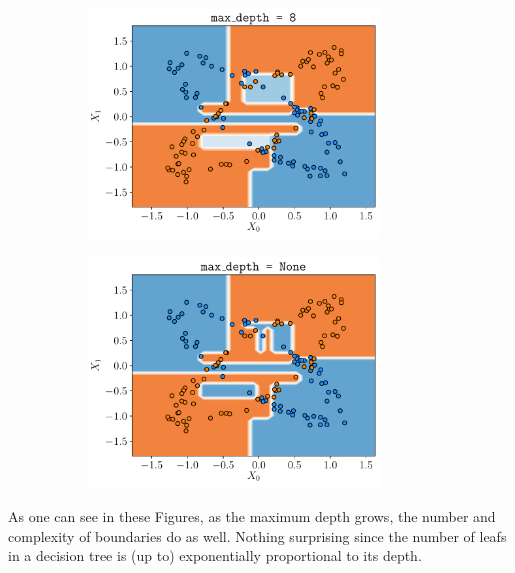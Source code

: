 \documentclass[a4paper, 12pt]{article}
\begin{document}
\begin{enumerate}[label = (\alph*)]
\begin{figure}[h]
\begin{subfigure}{0.49\textwidth}
        	    \includegraphics[width=0.85\textwidth]{resources/pdf/make_data2_depth8.pdf}
            \end{subfigure}
            \begin{subfigure}{0.49\textwidth}
                \centering
        	    \includegraphics[width=0.85\textwidth]{resources/pdf/make_data2_depthNone.pdf}
            \end{subfigure}
            \label{fig:decision_boundary_decision_tree_make_data2}
        \end{figure}
        
        As one can see in these Figures, as the maximum depth grows, the number and complexity of boundaries do as well. Nothing surprising since the number of leafs in a decision tree is (up to) exponentially proportional to its depth.
        

\end{enumerate}
\end{document}
